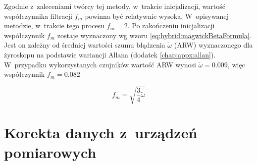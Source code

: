 Zgodnie z~zaleceniami twórcy tej metody, w~trakcie inicjalizacji, wartość współczynnika filtracji $f_m$ powinna być relatywnie wysoka. W~opisywanej metodzie, w~trakcie tego procesu $f_m = 2$. Po zakończeniu inicjalizacji współczynnik $f_m$ zostaje wyznaczony wg wzoru \eqref{eq:hybrid:magwickBetaFormula}. Jest on zależny od średniej wartości szumu błądzenia $\widetilde{\omega}$ (ARW) wyznaczonego dla żyroskopu na podstawie wariancji Allana (dodatek \ref{chap:appx:allan}). W~przypadku wykorzystanych czujników wartość ARW wynosi $\widetilde{\omega} = 0.009$, więc współczynnik $f_m = 0.082$

\begin{equation}
	f_m = \sqrt{\frac{3}{4}\widetilde{\omega}}
	\label{eq:hybrid:magwickBetaFormula}
\end{equation}

\section{Korekta danych z~urządzeń pomiarowych}

